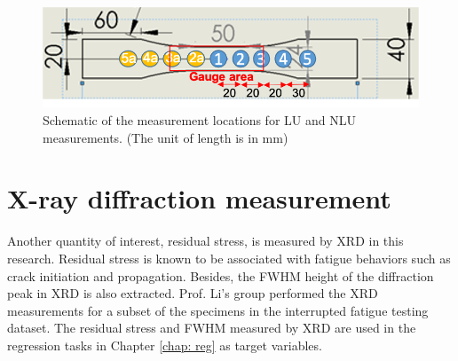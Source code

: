 \begin{figure}[tb]
  \centering
  \includegraphics[width=0.6\linewidth]{fig/specimen_measurment_locs.png}
  \caption{Schematic of the measurement locations for LU and NLU measurements. (The unit of length is in mm)}
  \label{fig: measurement locations}
\end{figure}

\section{X-ray diffraction measurement}
Another quantity of interest, residual stress, is measured by XRD in this research. Residual stress is known to be associated with fatigue behaviors such as crack initiation and propagation. Besides, the FWHM height of the diffraction peak in XRD is also extracted. Prof. Li's group performed the XRD measurements for a subset of the specimens in the interrupted fatigue testing dataset. The residual stress and FWHM measured by XRD are used in the regression tasks in Chapter \ref{chap: reg} as target variables.
